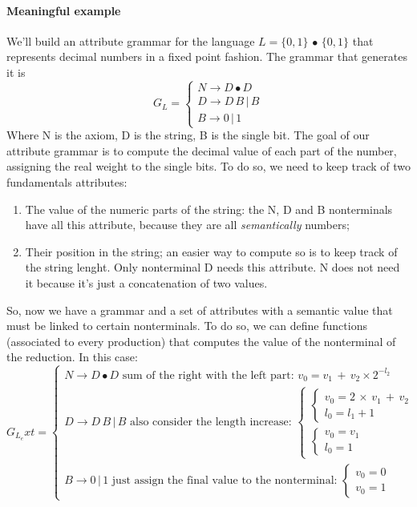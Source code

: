 \documentclass[10pt,a4paper]{article}
\begin{document}
				\paragraph{Meaningful example}
					We'll build an attribute grammar for the language $L = \{0, 1\} \,\bullet\, \{0, 1\}$ that represents decimal numbers in a fixed point fashion. The grammar that generates it is
					\begin{equation}
						G_L = 
						\begin{cases}
							N \rightarrow D \bullet D \\
							D \rightarrow D \, B \, \vert \, B \\
							B \rightarrow 0 \, \vert \, 1
						\end{cases}
					\end{equation}
					Where N is the axiom, D is the string, B is the single bit. The goal of our attribute grammar is to compute the decimal value of each part of the number, assigning the real weight to the single bits. To do so, we need to keep track of two fundamentals attributes:
					\begin{enumerate}
						\item The value of the numeric parts of the string: the N, D and B nonterminals have all this attribute, because they are all \emph{semantically} numbers;
						\item Their position in the string; an easier way to compute so is to keep track of the string lenght. Only nonterminal D needs this attribute. N does not need it because it's just a concatenation of two values. 
					\end{enumerate}
					So, now we have a grammar and a set of attributes with a semantic value that must be linked to certain nonterminals. To do so, we can define functions (associated to every production) that computes the value of the nonterminal of the reduction. In this case:
					\begin{equation}
						G_L_ext = 
						\begin{cases}
							N \rightarrow D \bullet D \text{ sum of the right with the left part: } v_0 = v_1\,+\,v_2\times 2^{-l_2} \\
							D \rightarrow D \, B \, \vert \, B \text{ also consider the length increase: } 
								\begin{cases}
									\begin{cases}
										v_0 = 2 \,\times\, v_1\,+\,v_2 \\
										l_0 = l_1 + 1
									\end{cases}\\
									\begin{cases}
										v_0 = v_1 \\
										l_0 = 1
									\end{cases}
								\end{cases}\\
							B \rightarrow 0 \, \vert \, 1 \text{ just assign the final value to the nonterminal: } 
								\begin{cases}
									v_0 = 0\\
									v_0 = 1
								\end{cases}
						\end{cases}
					\end{equation}
\end{document}
